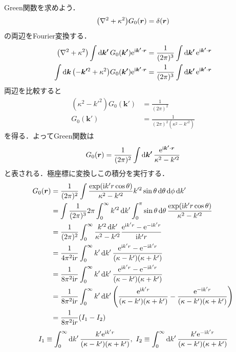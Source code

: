 \documentclass{report}
\begin{document}
  Green関数を求めよう．
  \begin{align}
    \qty(\nabla^2 + \kappa^2)G_0(\bm{r}) = \delta(\bm{r})
  \end{align}
  の両辺をFourier変換する．
  \begin{align}
    \qty(\nabla^2 + \kappa^2)\int \dd{\bm{k'}} G_0(\bm{k'}) \mathrm{e}^{\mathrm{i}\bm{k'}\cdot \bm{r}} &= \frac{1}{(2\pi)^3}\int \dd{\bm{k'}} \mathrm{e}^{\mathrm{i}\bm{k'}\cdot\bm{r}}\\
    \int \dd{\bm{k}} \qty(-\bm{k'}^2 + \kappa^2)G_0(\bm{k'}) \mathrm{e}^{\mathrm{i} \bm{k'}\cdot \bm{r}} &= \frac{1}{(2\pi)^3} \int \dd{\bm{k'}} \mathrm{e}^{\mathrm{i} \bm{k'}\cdot \bm{r}}
  \end{align}
  両辺を比較すると
  \begin{align}
    (\kappa^2 - k'^2)G_0(\bm{k'}) &= \frac{1}{(2\pi)^2}\\
    G_0(\bm{k'}) &= \frac{1}{(2\pi)^2 (\kappa^2 - k'^2)}
  \end{align}
  を得る．よってGreen関数は
  \begin{align}
    G_0(\bm{r}) = \frac{1}{(2\pi)^2}\int \dd{\bm{k'}} \frac{\mathrm{e}^{\mathrm{i}\bm{k'}\cdot\bm{r}}}{\kappa^2 - k'^2}
  \end{align}
  と表される．極座標に変換しこの積分を実行する．
  \begin{align}
    G_0(\bm{r}) &= \frac{1}{(2\pi)^2} \int \frac{\exp(\mathrm{i} k' r \cos \theta)}{\kappa^2 - k'^2}k'^2\sin\theta\dd{\theta}\dd{\phi}\dd{k'}\\
    &= \int \frac{1}{(2\pi)^3}2\pi \int_{0}^{\infty} k'^2 \dd{k'} \int_{0}^{\pi}\sin\theta\dd{\theta}\frac{\exp(\mathrm{i} k' r\cos\theta)}{\kappa^2 - k'^2}\\
    &= \frac{1}{(2\pi)^2} \int_{0}^{\infty} \frac{k'^2\dd{k'}}{\kappa^2 - k'^2}\frac{\mathrm{e}^{\mathrm{i} k'r} - \mathrm{e}^{-\mathrm{i} k'r}}{\mathrm{i} k'r}\\
    &= \frac{1}{4\pi^2\mathrm{i} r} \int_{0}^{\infty} k' \dd{k'} \frac{\mathrm{e}^{\mathrm{i} k'r} - \mathrm{e}^{-\mathrm{i} k'r}}{(\kappa - k')(\kappa + k')}\\
    &= \frac{1}{8\pi^2\mathrm{i} r} \int_{0}^{\infty}k' \dd{k'} \frac{\mathrm{e}^{\mathrm{i} k'r} - \mathrm{e}^{-\mathrm{i} k'r}}{(\kappa - k')(\kappa + k')}\\
    &= \frac{1}{8\pi^2\mathrm{i} r} \int_{0}^{\infty} k' \dd{k'} \qty(\frac{\mathrm{e}^{\mathrm{i} k'r}}{(\kappa - k')(\kappa + k')} - \frac{\mathrm{e}^{-\mathrm{i} k'r}}{(\kappa - k')(\kappa + k')})\\
    &= \frac{1}{8\pi^2 \mathrm{i} r}\qty(I_1 - I_2)
  \end{align}
  \begin{align}
    I_1 \equiv \int_{0}^{\infty} \dd{k'} \frac{k' \mathrm{e}^{\mathrm{i} k'r}}{(\kappa - k')(\kappa + k')},\ I_2 \equiv \int_{0}^{\infty} \dd{k'} \frac{k' \mathrm{e}^{-\mathrm{i} k'r}}{(\kappa - k')(\kappa + k')}
  \end{align}
\end{document}
